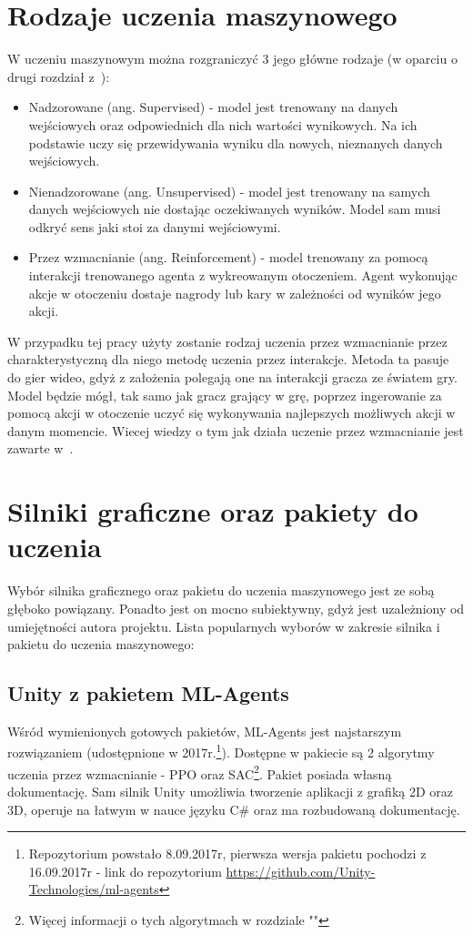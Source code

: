 \documentclass{SGGW-thesis}
\begin{document}
\section{Rodzaje uczenia maszynowego}
W uczeniu maszynowym można rozgraniczyć 3 jego główne rodzaje (w oparciu o drugi rozdział z~\cite{MachineLearningTypes}):
\begin{itemize}
  \item{Nadzorowane (ang. Supervised) - model jest trenowany na danych wejściowych oraz odpowiednich dla nich wartości wynikowych. Na ich podstawie uczy się przewidywania wyniku dla nowych, nieznanych danych wejściowych.}
  \item{Nienadzorowane (ang. Unsupervised) - model jest trenowany na samych danych wejściowych nie dostając oczekiwanych wyników. Model sam musi odkryć sens jaki stoi za danymi wejściowymi.}
  \item{Przez wzmacnianie (ang. Reinforcement) - model trenowany za pomocą interakcji trenowanego agenta z wykreowanym otoczeniem. Agent wykonując akcje w otoczeniu dostaje nagrody lub kary w zależności od wyników jego akcji.}
\end{itemize}
W przypadku tej pracy użyty zostanie rodzaj uczenia przez wzmacnianie przez charakterystyczną dla niego metodę uczenia przez interakcje. Metoda ta pasuje do gier wideo, gdyż z założenia polegają one na interakcji gracza ze światem gry.
Model będzie mógł, tak samo jak gracz grający w grę, poprzez ingerowanie za pomocą akcji w otoczenie uczyć się wykonywania najlepszych możliwych akcji w danym momencie. Wiecej wiedzy o tym jak działa uczenie przez wzmacnianie jest zawarte w~\cite{ReinforcementLearning}.


\section{Silniki graficzne oraz pakiety do uczenia}
Wybór silnika graficznego oraz pakietu do uczenia maszynowego jest ze sobą głęboko powiązany. Ponadto jest on mocno subiektywny, gdyż jest uzależniony od umiejętności autora projektu. Lista popularnych wyborów w zakresie silnika i pakietu do uczenia maszynowego:
\subsection{Unity z pakietem ML-Agents}
Wśród wymienionych gotowych pakietów, ML-Agents jest najstarszym rozwiązaniem (udostępnione w 2017r.\footnote{Repozytorium powstało 8.09.2017r, pierwsza wersja pakietu pochodzi z 16.09.2017r - link do repozytorium \url{https://github.com/Unity-Technologies/ml-agents}}).
Dostępne w pakiecie są 2 algorytmy uczenia przez wzmacnianie - PPO oraz SAC\footnote{Więcej informacji o tych algorytmach w rozdziale ""}. Pakiet posiada własną dokumentację\cite{MLAgentsDocs}. 
Sam silnik Unity umożliwia tworzenie aplikacji z grafiką 2D oraz 3D, operuje na łatwym w nauce języku C\# oraz ma rozbudowaną dokumentację\cite{UnityDocs}.
\end{document}

